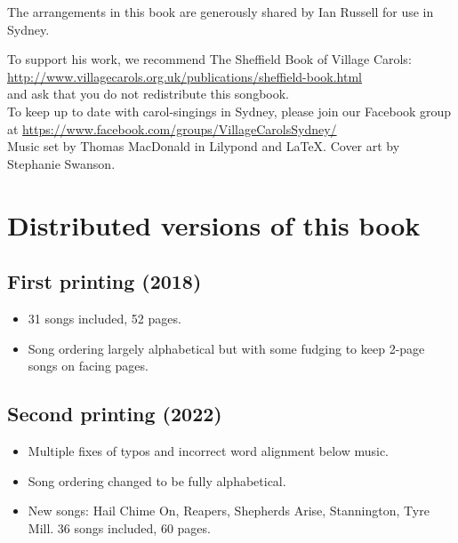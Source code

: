 \documentclass[a4paper,twoside]{article}
\date{\vspace{-12ex}}
\newcommand*{\offset}{5mm}
\begin{document}
%

\clearpage

\thispagestyle{empty}
    \null{}
        \begin{center}        
The arrangements in this book are generously shared by Ian Russell for use in Sydney. 

To support his work, we recommend The Sheffield Book of Village Carols: \url{http://www.villagecarols.org.uk/publications/sheffield-book.html}\\
and ask that you do not redistribute this songbook.\\


To keep up to date with carol-singings in Sydney, please join our Facebook group at \url{https://www.facebook.com/groups/VillageCarolsSydney/}\\

Music set by Thomas MacDonald in Lilypond and LaTeX. Cover art by Stephanie Swanson.
       \end{center}
\null

\section*{Distributed versions of this book}
\subsection*{First printing (2018)}
\begin{itemize}
    \item 31 songs included, 52 pages.
    \item Song ordering largely alphabetical but with some fudging to keep 2-page songs on facing pages.
\end{itemize}
\subsection*{Second printing (2022)}
\begin{itemize}
    \item Multiple fixes of typos and incorrect word alignment below music.
    \item Song ordering changed to be fully alphabetical. 
    \item New songs: Hail Chime On, Reapers, Shepherds Arise, Stannington, Tyre Mill. 36 songs included, 60 pages.
\end{itemize} 
\clearpage
\end{document}
